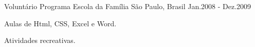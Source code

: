 \begin{cventries}
  \cventry
    {Voluntário}
    {Programa Escola da Família}
    {São Paulo, Brasil}
    {Jan.2008 - Dez.2009}
    {
      \begin{cvitems}
        \item {Aulas de Html, CSS, Excel e Word.}
        \item {Atividades recreativas.}
      \end{cvitems}
    }
\end{cventries}
